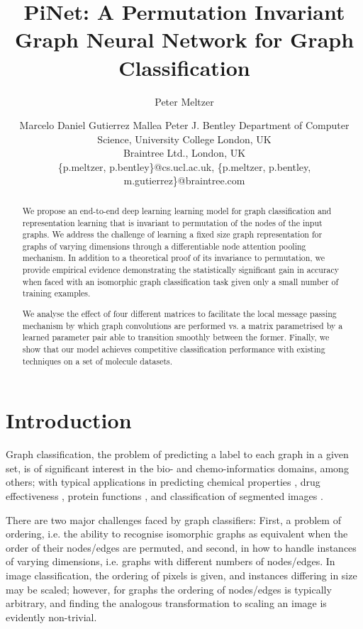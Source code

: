 \documentclass{article}
\title{PiNet: A Permutation Invariant Graph Neural Network for Graph Classification}
\author{
  Peter Meltzer
\and
Marcelo Daniel Gutierrez Mallea\And
Peter J. Bentley
\affiliations
Department of Computer Science, University College London, UK\\
Braintree Ltd., London, UK\\
\emails
\{p.meltzer, p.bentley\}@cs.ucl.ac.uk,
\{p.meltzer, p.bentley, m.gutierrez\}@braintree.com
}
\theoremstyle{definition}
\begin{document}
\maketitle

\begin{abstract}
We propose an end-to-end deep learning learning model for graph classification and representation learning that is invariant to permutation of the nodes of the input graphs. We address the challenge of learning a fixed size graph representation for graphs of varying dimensions through a differentiable node attention pooling mechanism. In addition to a theoretical proof of its invariance to permutation, we provide empirical evidence demonstrating the statistically significant gain in accuracy when faced with an isomorphic graph classification task given only a small number of training examples.
  
We analyse the effect of four different matrices to facilitate the local message passing mechanism by which graph convolutions are performed vs. a matrix parametrised by a learned parameter pair able to transition smoothly between the former. Finally, we show that our model achieves competitive classification performance with existing techniques on a set of molecule datasets.
\end{abstract}

\section{Introduction}

Graph classification, the problem of predicting a label to each graph in a given set, is of significant interest in the bio- and chemo-informatics domains, among others; with typical applications in predicting chemical properties \cite{Li2016}, drug effectiveness \cite{Bunke2009}, protein functions \cite{Shervashidze2009}, and classification of segmented images \cite{Scarselli2009}.

There are two major challenges faced by graph classifiers: First, a problem of ordering, i.e. the ability to recognise isomorphic graphs as equivalent when the order of their nodes/edges are permuted, and second, in how to handle instances of varying dimensions, i.e. graphs with different numbers of nodes/edges. In image classification, the ordering of pixels is given, and instances differing in size may be scaled; however, for graphs the ordering of nodes/edges is typically arbitrary, and finding the analogous transformation to scaling an image is evidently non-trivial.
\end{document}
